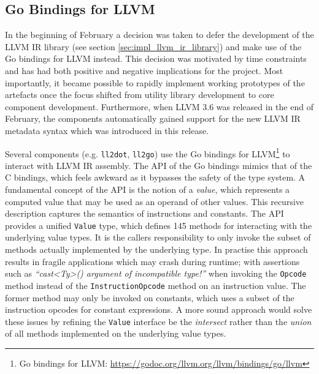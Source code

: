
\subsection{Go Bindings for LLVM}
\label{sec:impl_go_bindings_for_llvm}

In the beginning of February a decision was taken to defer the development of the LLVM IR library (see section \ref{sec:impl_llvm_ir_library}) and make use of the Go bindings for LLVM instead. This decision was motivated by time constraints and has had both positive and negative implications for the project. Most importantly, it became possible to rapidly implement working prototypes of the artefacts once the focus shifted from utility library development to core component development. Furthermore, when LLVM 3.6 was released in the end of February, the components automatically gained support for the new LLVM IR metadata syntax which was introduced in this release.

Several components (e.g. \texttt{ll2dot}, \texttt{ll2go}) use the Go bindings for LLVM\footnote{Go bindings for LLVM: \url{https://godoc.org/llvm.org/llvm/bindings/go/llvm}} to interact with LLVM IR assembly. The API of the Go bindings mimics that of the C bindings, which feels awkward as it bypasses the safety of the type system. A fundamental concept of the API is the notion of a \textit{value}, which represents a computed value that may be used as an operand of other values. This recursive description captures the semantics of instructions and constants. The API provides a unified \texttt{Value} type, which defines 145 methods for interacting with the underlying value types. It is the callers responsibility to only invoke the subset of methods actually implemented by the underlying type. In practise this approach results in fragile applications which may crash during runtime; with assertions such as \textit{``cast<Ty>() argument of incompatible type!''} when invoking the \texttt{Opcode} method instead of the \texttt{InstructionOpcode} method on an instruction value. The former method may only be invoked on constants, which uses a subset of the instruction opcodes for constant expressions. A more sound approach would solve these issues by refining the \texttt{Value} interface be the \textit{intersect} rather than the \textit{union} of all methods implemented on the underlying value types.

